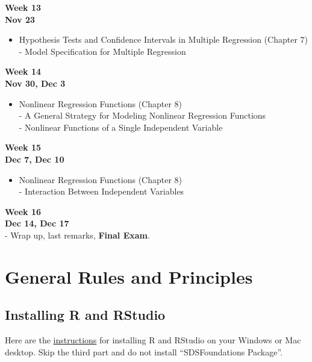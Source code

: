 \documentclass[
]{book}
\providecommand{\tightlist}{%
  \setlength{\itemsep}{0pt}\setlength{\parskip}{0pt}}
\begin{document}
\textbf{Week 13}\\
\textbf{Nov 23}

\begin{itemize}
\tightlist
\item
  Hypothesis Tests and Confidence Intervals in Multiple Regression (Chapter 7)\\
  - Model Specification for Multiple Regression
\end{itemize}

\textbf{Week 14}\\
\textbf{Nov 30, Dec 3}

\begin{itemize}
\tightlist
\item
  Nonlinear Regression Functions (Chapter 8)\\
  - A General Strategy for Modeling Nonlinear Regression Functions\\
  - Nonlinear Functions of a Single Independent Variable
\end{itemize}

\textbf{Week 15}\\
\textbf{Dec 7, Dec 10}

\begin{itemize}
\tightlist
\item
  Nonlinear Regression Functions (Chapter 8)\\
  - Interaction Between Independent Variables
\end{itemize}

\textbf{Week 16}\\
\textbf{Dec 14, Dec 17}\\
- Wrap up, last remarks, \textbf{Final Exam}.

\hypertarget{general-rules-and-principles}{%
\chapter{General Rules and Principles}\label{general-rules-and-principles}}

\hypertarget{installing-r-and-rstudio}{%
\section{Installing R and RStudio}\label{installing-r-and-rstudio}}

Here are the \href{https://courses.edx.org/courses/UTAustinX/UT.7.01x/3T2014/56c5437b88fa43cf828bff5371c6a924/}{instructions} for installing R and RStudio on your Windows or Mac desktop. Skip the third part and do not install ``SDSFoundations Package''.
\end{document}
